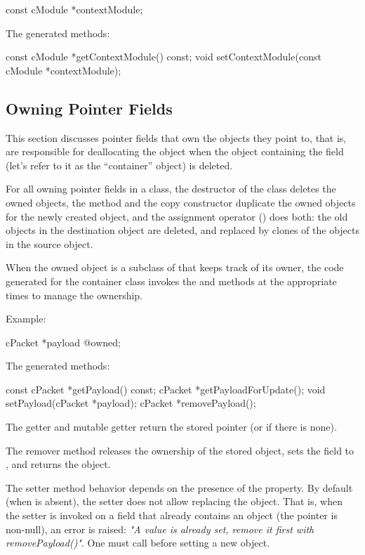 \begin{msg}
const cModule *contextModule;
\end{msg}

The generated methods:

\begin{cpp}
const cModule *getContextModule() const;
void setContextModule(const cModule *contextModule);
\end{cpp}


\subsection{Owning Pointer Fields}
\label{sec:msg-defs:owning-pointer-fields}

This section discusses pointer fields that own the objects they point to, that
is, are responsible for deallocating the object when the object containing the
field (let's refer to it as the ``container'' object) is deleted.

For all owning pointer fields in a class, the destructor of the class deletes the
owned objects, the  method and the copy constructor duplicate the
owned objects for the newly created object, and the assignment operator
() does both: the old objects in the destination object are
deleted, and replaced by clones of the objects in the source object.

When the owned object is a subclass of  that keeps track of
its owner, the code generated for the container class invokes the 
and  methods at the appropriate times to manage the ownership.

Example:

\begin{msg}
cPacket *payload @owned;
\end{msg}

The generated methods:

\begin{cpp}
const cPacket *getPayload() const;
cPacket *getPayloadForUpdate();
void setPayload(cPacket *payload);
cPacket *removePayload();
\end{cpp}

The getter and mutable getter return the stored pointer (or  if
there is none).

The remover method releases the ownership of the stored object, sets the field
to , and returns the object.

The setter method behavior depends on the presence of the 
property. By default (when  is absent), the setter does not
allow replacing the object. That is, when the setter is invoked on a field that
already contains an object (the pointer is non-null), an error is raised:
\textit{"A value is already set, remove it first with removePayload()"}.
One must call  before setting a new object.

